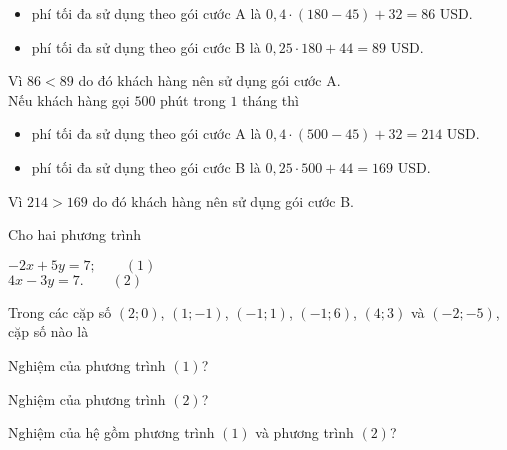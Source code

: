 \begin{bt}
{\begin{enumerate}
	\begin{itemize}
	\item phí tối đa sử dụng theo gói cước A là $0{,}4\cdot(180-45) + 32 = 86$ USD.
	\item phí tối đa sử dụng theo gói cước B là $0{,}25\cdot 180 + 44 = 89$ USD.
	\end{itemize}
	Vì $86 < 89$ do đó khách hàng nên sử dụng gói cước A.\\
	Nếu khách hàng gọi $500$ phút trong $1$ tháng thì
	\begin{itemize}
	\item phí tối đa sử dụng theo gói cước A là $0{,}4\cdot(500-45) + 32 = 214$ USD.
	\item phí tối đa sử dụng theo gói cước B là $0{,}25\cdot 500 + 44 = 169$ USD.
	\end{itemize}
	Vì $214 > 169$ do đó khách hàng nên sử dụng gói cước B.
	\end{enumerate}
	}
\end{bt}
\begin{bt}
	Cho hai phương trình
	\begin{center}
	$-2x+5y=7;\qquad (1)$\\
	$4x-3y=7.\qquad (2)$
	\end{center}
	Trong các cặp số $(2;0)$, $(1;-1)$, $(-1;1)$, $(-1;6)$, $(4;3)$ và $(-2;-5)$, cặp số nào là
	\begin{listEX}[1]
	\item Nghiệm của phương trình $(1)$?
	\item Nghiệm của phương trình $(2)$?
	\item Nghiệm của hệ gồm phương trình $(1)$ và phương trình $(2)$?
	\end{listEX}
\end{bt}
